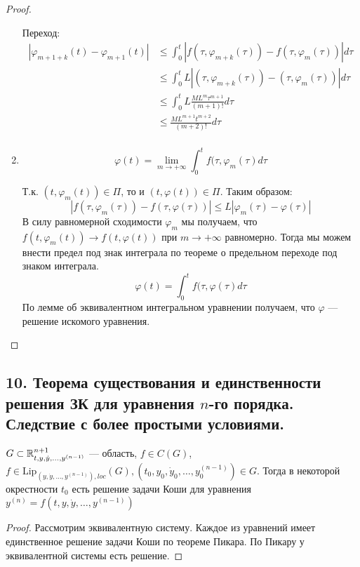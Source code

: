 \begin{proof}
\begin{enumerate}
              Переход:
              \begin{align*}
                  |\varphi_{m + 1 + k}(t) - \varphi_{m + 1}(t)|
                   & \leq \int_0^t |f(\tau, \varphi_{m + k}(\tau)) - f(\tau, \varphi_m(\tau))|d\tau \\
                   & \leq \int_0^t L|(\tau, \varphi_{m + k}(\tau)) - (\tau, \varphi_m(\tau))|d\tau  \\
                   & \leq \int_0^t L\frac{ML^m\tau^{m + 1}}{(m + 1)!}d\tau                          \\
                   & \leq \frac{ML^{m + 1}t^{m + 2}}{(m + 2)!}d\tau                                 \\
              \end{align*}
        \item \[\varphi(t) = \lim_{m\to +\infty} \int_0^t f(\tau, \varphi_m(\tau)d\tau\]

              Т.к. \((t, \varphi_m(t))\in \Pi\), то и \((t, \varphi(t))\in \Pi\). Таким образом:
              \[|f(\tau, \varphi_m(\tau)) - f(\tau, \varphi(\tau))| \leq L|\varphi_m(\tau) - \varphi(\tau)|\]
              В силу равномерной сходимости \(\varphi_m\) мы получаем, что \(f(t, \varphi_m(t)) \to f(t, \varphi(t))\) при \(m \to +\infty\) равномерно. Тогда мы можем внести предел под знак интеграла по теореме о предельном переходе под знаком интеграла.
              \[\varphi(t) = \int_0^t f(\tau, \varphi(\tau)d\tau\]
              По лемме об эквивалентном интегральном уравнении получаем, что \(\varphi\) --- решение искомого уравнения.
    \end{enumerate}
\end{proof}

\subsection*{10. Теорема существования и единственности решения ЗК для уравнения $n$-го порядка. Следствие с более простыми условиями.}

\begin{theorem}
    \(G\subset \mathbb{R}^{n + 1}_{t, y, \dot{y}, \dots , y^{(n - 1)}}\) --- область, \(f\in C(G)\), \(f\in \text{Lip}_{(y, \dot{y}, \dots , y^{(n - 1)}), loc}(G), (t_0, y_0, \dot{y}_0, \dots , y^{(n-1)}_0)\in G\). Тогда в некоторой окрестности \(t_0\) есть решение задачи Коши для уравнения \(y^{(n)} = f(t, y, \dot{y}, \dots , y^{(n - 1)})\)
\end{theorem}

\begin{proof}
    Рассмотрим эквивалентную систему. Каждое из уравнений имеет единственное решение задачи Коши по теореме Пикара. По Пикару у эквивалентной системы есть решение.
\end{proof}


